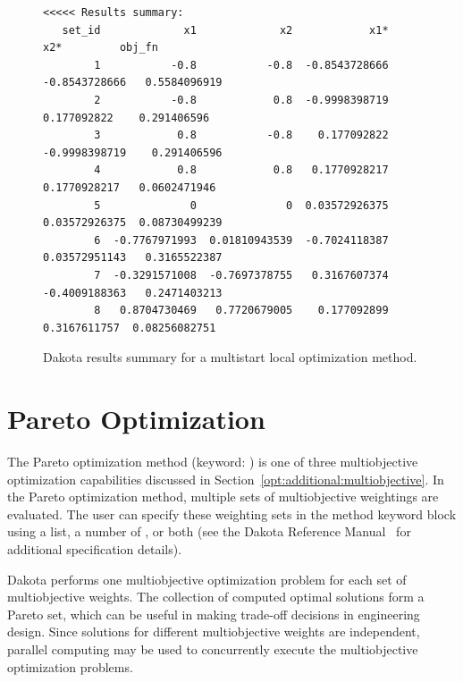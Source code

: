 \begin{figure}
\centering
\begin{bigbox}
\begin{footnotesize}
\begin{verbatim}
<<<<< Results summary:
   set_id             x1             x2            x1*            x2*         obj_fn 
        1           -0.8           -0.8  -0.8543728666  -0.8543728666   0.5584096919 
        2           -0.8            0.8  -0.9998398719    0.177092822    0.291406596 
        3            0.8           -0.8    0.177092822  -0.9998398719    0.291406596 
        4            0.8            0.8   0.1770928217   0.1770928217   0.0602471946 
        5              0              0  0.03572926375  0.03572926375  0.08730499239 
        6  -0.7767971993  0.01810943539  -0.7024118387  0.03572951143   0.3165522387 
        7  -0.3291571008  -0.7697378755   0.3167607374  -0.4009188363   0.2471403213 
        8   0.8704730469   0.7720679005    0.177092899   0.3167611757  0.08256082751 
\end{verbatim}
\end{footnotesize}
\end{bigbox}
\caption{Dakota results summary for a multistart local optimization method.}
\label{adv_meth:figure03}
\end{figure}

\section{Pareto Optimization}\label{adv_meth:pareto}

The Pareto optimization method (keyword: ) is
one of three multiobjective optimization capabilities discussed in
Section~\ref{opt:additional:multiobjective}. In the Pareto
optimization method, multiple sets of multiobjective weightings are
evaluated. The user can specify these weighting sets in the method
keyword block using a  list, a
number of , or both (see the Dakota
Reference Manual~\cite{RefMan} for additional specification details).

Dakota performs one multiobjective optimization problem for each set
of multiobjective weights. The collection of computed optimal
solutions form a Pareto set, which can be useful in making trade-off
decisions in engineering design. Since solutions for different
multiobjective weights are independent, parallel computing may be used
to concurrently execute the multiobjective optimization problems.

